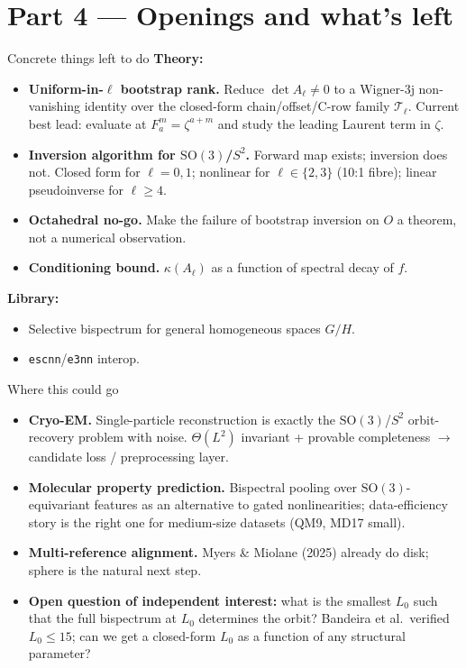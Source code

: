 \documentclass[10pt,aspectratio=169]{beamer}
\newcommand{\SO}{\mathrm{SO}}
\begin{document}
\section{Part 4 --- Openings and what's left}

\begin{frame}{Concrete things left to do}
\textbf{Theory:}
\begin{itemize}
  \item \textbf{Uniform-in-$\ell$ bootstrap rank.}
        Reduce $\det A_\ell \ne 0$ to a Wigner-3j non-vanishing identity
        over the closed-form chain/offset/C-row family $\mathcal T_\ell$.
        Current best lead: evaluate at $F_a^m = \zeta^{a+m}$ and study the
        leading Laurent term in $\zeta$.
  \item \textbf{Inversion algorithm for $\SO(3)$/$S^2$.}
        Forward map exists; inversion does not. Closed form for $\ell=0,1$;
        nonlinear for $\ell \in \{2,3\}$ (10:1 fibre); linear pseudoinverse
        for $\ell \ge 4$.
  \item \textbf{Octahedral no-go.}
        Make the failure of bootstrap inversion on $O$ a theorem,
        not a numerical observation.
  \item \textbf{Conditioning bound.}
        $\kappa(A_\ell)$ as a function of spectral decay of $f$.
\end{itemize}
\textbf{Library:}
\begin{itemize}
  \item Selective bispectrum for general homogeneous spaces $G/H$.
  \item \texttt{escnn}/\texttt{e3nn} interop.
\end{itemize}
\end{frame}

\begin{frame}{Where this could go}
\begin{itemize}
  \item \textbf{Cryo-EM.}
        Single-particle reconstruction is exactly the
        $\SO(3)$/$S^2$ orbit-recovery problem with noise.
        $\Theta(L^2)$ invariant + provable completeness $\to$ candidate
        loss / preprocessing layer.
  \item \textbf{Molecular property prediction.}
        Bispectral pooling over $\SO(3)$-equivariant features as
        an alternative to gated nonlinearities; data-efficiency
        story is the right one for medium-size datasets (QM9, MD17 small).
  \item \textbf{Multi-reference alignment.}
        Myers \& Miolane (2025) already do disk; sphere is the natural next step.
  \item \textbf{Open question of independent interest:}
        what is the smallest $L_0$ such that the full bispectrum at $L_0$
        determines the orbit? Bandeira et al.\ verified $L_0 \le 15$;
        can we get a closed-form $L_0$ as a function of any structural
        parameter?
\end{itemize}
\end{frame}
\end{document}
